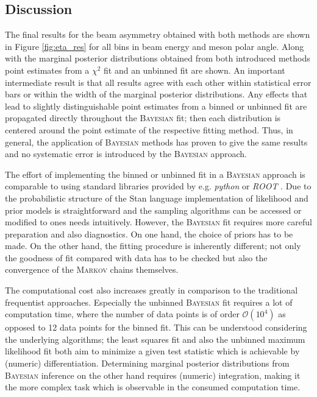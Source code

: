 \subsection{Discussion}
\label{sec:sigma_eta}
The final results for the beam asymmetry obtained with both methods are shown in Figure \ref{fig:eta_res} for all bins in beam energy and meson polar angle. Along with the marginal posterior distributions obtained from both introduced methods point estimates from a $\chi^2$ fit and an unbinned fit \cite{farahphd} are shown. An important intermediate result is that all results agree with each other within statistical error bars or within the width of the marginal posterior distributions. Any effects that lead to slightly distinguishable point estimates from a binned or unbinned fit are propagated directly throughout the \textsc{Bayesian} fit; then each distribution is centered around the point estimate of the respective fitting method. Thus, in general, the application of \textsc{Bayesian} methods has proven to give the same results and no systematic error is introduced by the \textsc{Bayesian} approach. 

The effort of implementing the binned or unbinned fit in a \textsc{Bayesian} approach is comparable to using standard libraries provided by e.g. \emph{python} \cite{python} or \emph{ROOT} \cite{root}. Due to the probabilistic structure of the Stan language \cite{stan} implementation of likelihood and prior models is straightforward and the sampling algorithms can be accessed or modified to ones needs intuitively. However, the \textsc{Bayesian} fit requires more careful preparation and also diagnostics. On one hand, the choice of priors has to be made. On the other hand, the fitting procedure is inherently different; not only the goodness of fit compared with data has to be checked but also the convergence of the \textsc{Markov} chains themselves. 

The computational cost also increases greatly in comparison to the traditional frequentist approaches. Especially the unbinned \textsc{Bayesian} fit requires a lot of computation time,  where the number of data points is of order $\mathcal{O}(10^4)$ as opposed to 12 data points for the binned fit. This can be understood considering the underlying algorithms; the least squares fit and also the unbinned maximum likelihood fit both aim to minimize a given test statistic which is achievable by (numeric) differentiation. Determining marginal posterior distributions from \textsc{Bayesian} inference on the other hand requires (numeric) integration, making it the more complex task which is observable in the consumed computation time. 

